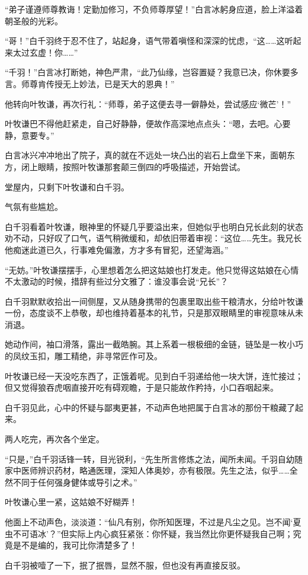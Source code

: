 “弟子谨遵师尊教诲！定勤加修习，不负师尊厚望！”白言冰躬身应道，脸上洋溢着朝圣般的光彩。

“哥！”白千羽终于忍不住了，站起身，语气带着嗔怪和深深的忧虑，“这……这听起来太过玄虚！你……”

“千羽！”白言冰打断她，神色严肃，“此乃仙缘，岂容置疑？我意已决，你休要多言。师尊肯传授无上妙法，已是天大的恩典！”

他转向叶牧谦，再次行礼：“师尊，弟子这便去寻一僻静处，尝试感应‘微芒’！”

叶牧谦巴不得他赶紧走，自己好静静，便故作高深地点点头：“嗯，去吧。心要静，意要专。”

白言冰兴冲冲地出了院子，真的就在不远处一块凸出的岩石上盘坐下来，面朝东方，闭上眼睛，按照叶牧谦那套颠三倒四的呼吸描述，开始尝试。

堂屋内，只剩下叶牧谦和白千羽。

气氛有些尴尬。

白千羽看着叶牧谦，眼神里的怀疑几乎要溢出来，但她似乎也明白兄长此刻的状态劝不动，只好叹了口气，语气稍微缓和，却依旧带着审视：“这位……先生。我兄长他痴迷此道已久，行事难免偏激，方才多有冒犯，还望海涵。”

“无妨。”叶牧谦摆摆手，心里想着怎么把这姑娘也打发走。他只觉得这姑娘在心情不太激动的时候，措辞有些过分文雅了：谁没事会说“兄长”？

白千羽默默收拾出一间侧屋，又从随身携带的包裹里取出些干粮清水，分给叶牧谦一份，态度谈不上恭敬，却也维持着基本的礼节，只是那双眼睛里的审视意味从未消退。

她动作间，袖口滑落，露出一截皓腕。其上系着一根极细的金链，链坠是一枚小巧的凤纹玉扣，雕工精绝，非寻常匠作可及。

叶牧谦已经一天没吃东西了，正饿着呢。见到白千羽递给他一块大饼，连忙接过；但又觉得狼吞虎咽直接开吃有碍观瞻，于是只能故作矜持，小口吞咽起来。

白千羽见此，心中的怀疑与鄙夷更甚，不动声色地把属于白言冰的那份干粮藏了起来。

两人吃完，再次各个坐定。

“只是，”白千羽话锋一转，目光锐利，“先生所言修炼之法，闻所未闻。千羽自幼随家中医师辨识药材，略通医理，深知人体奥妙，亦有极限。先生之法，似乎……全然不同于任何强身健体或导引之术。”

叶牧谦心里一紧，这姑娘不好糊弄！

他面上不动声色，淡淡道：“仙凡有别，你所知医理，不过是凡尘之见。岂不闻‘夏虫不可语冰’？”但实际上内心疯狂紧张：你怀疑，我当然比你更怀疑我自己啊；究竟是不是编的，我可比你清楚多了！

白千羽被噎了一下，抿了抿唇，显然不服，但也没有再直接反驳。

